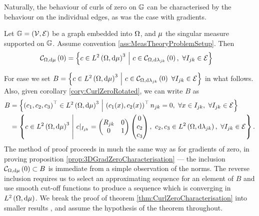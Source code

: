 Naturally, the behaviour of curls of zero on $\mathbb{G}$ can be characterised by the behaviour on the individual edges, as was the case with gradients.
\begin{theorem} \label{thm:CurlZeroCharacterisation}
	Let $\mathbb{G}=\left( \mathcal{V}, \mathcal{E} \right)$ be a graph embedded into $\Omega$, and $\mu$ the singular measure supported on $\mathbb{G}$.
	Assume convention \ref{ass:MeasTheoryProblemSetup}.
	Then
	\begin{align*}
		\mathcal{C}_{ \Omega, \mathrm{d}\mu}\left( 0 \right) &= 
		\left\{  c\in L^{2}\left( \Omega,\mathrm{d}\mu \right)^3 \ \middle\vert \  c\in\mathcal{C}_{ \Omega, \mathrm{d}\lambda_{jk}}\left( 0 \right), \ \forall I_{jk}\in\mathcal{E}  \right\}
	\end{align*}
\end{theorem}
For ease we set $B = \clbracs{ c\in\ltwo{\ddom}{\ddmes}^3 \setVert c\in\curlZero{\ddom}{\lambda_{jk}} \ \forall I_{jk}\in\edgeSet }$ in what follows.
Also, given corollary \ref{cory:CurlZeroRotated}, we can write $B$ as
\begin{align*}
	B &= \left\{  \left( c_1, c_2, c_3 \right)^\top\in L^{2}\left( \Omega,\mathrm{d}\mu \right)^3 \ \middle\vert \  \left( c_1(x), c_2(x) \right)^\top n_{jk}=0, \ \forall x\in I_{jk}, \ \forall I_{jk}\in\mathcal{E}  \right\} \\
	&= \left\{  c\in L^{2}\left( \Omega,\mathrm{d}\mu \right)^3 \ \middle\vert \  c\vert_{I_{jk}} = \begin{pmatrix} R_{jk} & 0 \\ 0 & 1 \end{pmatrix} \begin{pmatrix} 0 \\ c_2 \\ c_3 \end{pmatrix}, \ c_2, c_3\in L^{2}\left( \Omega,\mathrm{d}\lambda_{jk} \right), \ \forall I_{jk}\in\mathcal{E}  \right\}.
\end{align*}
The method of proof proceeds in much the same way as for gradients of zero, in proving proposition \ref{prop:3DGradZeroCharacterisation} --- the inclusion $\mathcal{C}_{ \Omega, \mathrm{d}\mu}\left( 0 \right)\subset B$ is immediate from a simple observation of the norms.
The reverse inclusion requires us to select an approximating sequence for an element of $B$ and use smooth cut-off functions to produce a sequence which is converging in $L^{2}\left( \Omega,\mathrm{d}\mu \right)$.
We break the proof of theorem \ref{thm:CurlZeroCharacterisation} into smaller results , and assume the hypothesis of the theorem throughout.

